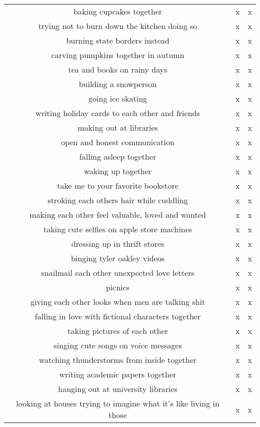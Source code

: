 \documentclass[a4paper]{article}
\begin{document}
\begin{table}[htb]
\begin{tabular}{@{}ccc@{}}
        baking cupcakes together &  x &  x \\
        trying not to burn down the kitchen doing so &  x &  x \\
        burning state borders instead &  x &  x \\
        carving pumpkins together in autumn &  x &  x \\
        tea and books on rainy days &  x &  x \\
        building a snowperson &  x &  x \\
        going ice skating &  x &  x \\
        writing holiday cards to each other and friends &  x &  x \\
        making out at libraries &  x &  x \\
        open and honest communication &  x &  x \\
        falling asleep together &  x &  x \\
        waking up together &  x &  x \\
        take me to your favorite bookstore &  x &  x \\
        stroking each others hair while cuddling &  x &  x \\
        making each other feel valuable, loved and wanted &  x &  x \\
        taking cute selfies on apple store machines &  x &  x \\
        dressing up in thrift stores &  x &  x \\
        binging tyler oakley videos &  x &  x \\
        snailmail each other unexpected love letters &  x &  x \\
        picnics &  x &  x \\
        giving each other looks when men are talking shit &  x &  x \\
        falling in love with fictional characters together &  x &  x \\
        taking pictures of each other &  x &  x \\
        singing cute songs on voice messages &  x &  x \\
        watching thunderstorms from inside together &  x &  x \\
        writing academic papers together &  x &  x \\
        hanging out at university libraries &  x &  x \\
        looking at houses trying to imagine what it's like living in those &  x &  x \\

\end{tabular}
\end{table}
\end{document}
